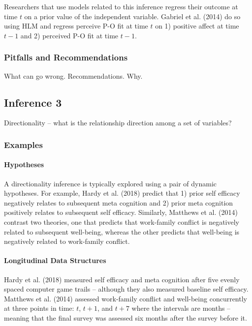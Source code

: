 \documentclass[english,,man]{apa6}
\let\oldparagraph\paragraph
\renewcommand{\paragraph}[1]{\oldparagraph{#1}\mbox{}}
\theoremstyle{definition}
\theoremstyle{definition}
\theoremstyle{definition}
\theoremstyle{remark}
\begin{document}
Researchers that use models related to this inference regress their
outcome at time \(t\) on a prior value of the independent variable.
Gabriel et al. (2014) do so using HLM and regress perceive P-O fit at
time \(t\) on 1) positive affect at time \(t-1\) and 2) perceived P-O
fit at time \(t-1\).

\hypertarget{pitfalls-and-recommendations-8}{%
\subsubsection{Pitfalls and
Recommendations}\label{pitfalls-and-recommendations-8}}

What can go wrong. Recommendations. Why.

\hypertarget{inference-3-1}{%
\subsection{Inference 3}\label{inference-3-1}}

Directionality -- what is the relationship direction among a set of
variables?

\hypertarget{examples-8}{%
\subsubsection{Examples}\label{examples-8}}

\hypertarget{hypotheses-9}{%
\paragraph{Hypotheses}\label{hypotheses-9}}

A directionality inference is typically explored using a pair of dynamic
hypotheses. For example, Hardy et al. (2018) predict that 1) prior self
efficacy negatively relates to subsequent meta cognition and 2) prior
meta cognition positively relates to subsequent self efficacy.
Similarly, Matthews et al. (2014) contrast two theories, one that
predicts that work-family conflict is negatively related to subsequent
well-being, whereas the other predicts that well-being is negatively
related to work-family conflict.

\hypertarget{longitudinal-data-structures-3}{%
\paragraph{Longitudinal Data
Structures}\label{longitudinal-data-structures-3}}

Hardy et al. (2018) measured self efficacy and meta cognition after five
evenly spaced computer game trails -- although they also measured
baseline self efficacy. Matthews et al. (2014) assessed work-family
conflict and well-being concurrently at three points in time: \(t\),
\(t+1\), and \(t+7\) where the intervals are months -- meaning that the
final survey was assessed six months after the survey before it.
\end{document}
